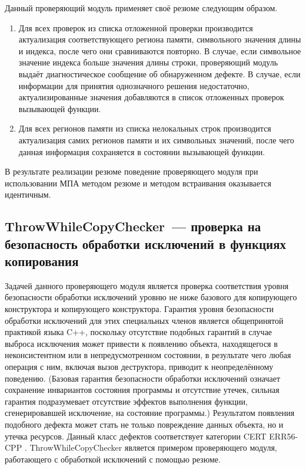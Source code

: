 Данный проверяющий модуль применяет своё резюме следующим образом.

\begin{enumerate}
 \item Для всех проверок из списка отложенной проверки производится актуализация соответствующего региона памяти, символьного значения длины и индекса, после чего они сравниваются повторно. В случае, если символьное значение индекса больше значения длины строки, проверяющий модуль выдаёт диагностическое сообщение об обнаруженном дефекте. В случае, если информации для принятия однозначного решения недостаточно, актуализированные значения добавляются в список отложенных проверок вызывающей функции.
 \item Для всех регионов памяти из списка нелокальных строк производится актуализация самих регионов памяти и их символьных значений, после чего данная информация сохраняется в состоянии вызывающей функции.
\end{enumerate}

В результате реализации резюме поведение проверяющего модуля при использовании МПА методом резюме и методом встраивания оказывается идентичным.

\subsection{ThrowWhileCopyChecker~--- проверка на безопасность обработки исключений в функциях копирования}

Задачей данного проверяющего модуля является проверка соответствия уровня безопасности обработки исключений уровню не ниже базового для копирующего конструктора и копирующего конструктора. Гарантия уровня безопасности обработки исключений для этих специальных членов является общепринятой практикой языка C++, поскольку отсутствие подобных гарантий в случае выброса исключения может привести к появлению объекта, находящегося в неконсистентном или в непредусмотренном состоянии, в результате чего любая операция с ним, включая вызов деструктора, приводит к неопределённому поведению. (Базовая гарантия безопасности обработки исключений означает сохранение инвариантов состояния программы и отсутствие утечек, сильная гарантия подразумевает отсутствие эффектов выполнения функции, сгенерировавшей исключение, на состояние программы.)  Результатом появления подобного дефекта может стать не только повреждение данных объекта, но и утечка ресурсов. Данный класс дефектов соответствует категории CERT ERR56-CPP . ThrowWhileCopyChecker является примером проверяющего модуля, работающего с обработкой исключений с помощью резюме.

